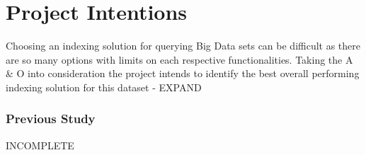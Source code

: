 \section{Project Intentions}
Choosing an indexing solution for querying Big Data sets can be difficult as there are so many options with limits on each respective functionalities. Taking the A \& O into consideration the project intends to identify the best overall performing indexing solution for this dataset - EXPAND
\subsubsection{Previous Study}
INCOMPLETE